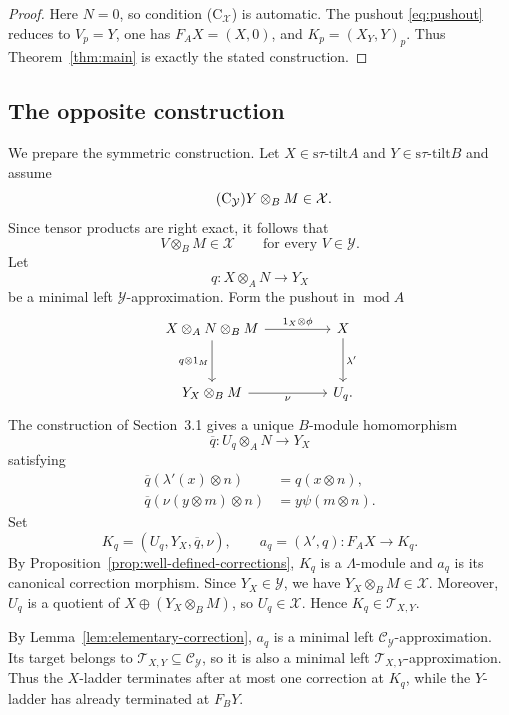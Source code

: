 \documentclass[11pt,reqno]{amsart}
\theoremstyle{definition}
\theoremstyle{remark}
\newcommand{\modu}{\operatorname{mod}}
\newcommand{\stau}{\mathrm{s}\tau\text{-}\mathrm{tilt}}
\numberwithin{equation}{section}
\begin{document}
\begin{proof}
Here $N=0$, so condition \textup{(C$_{\mathcal X}$)} is automatic.  The pushout
\eqref{eq:pushout} reduces to $V_p=Y$, one has $F_AX=(X,0)$, and
$K_p=(X_Y,Y)_p$.  Thus Theorem~\ref{thm:main} is exactly the stated
construction.
\end{proof}

\subsection{The opposite construction}

We prepare the symmetric construction.  Let $X\in\stau A$ and
$Y\in\stau B$ and assume
\begin{equation*}\tag{C$_{\mathcal Y}$}
 Y\otimes_BM\in\mathcal X.
\end{equation*}
Since tensor products are right exact, it follows that
\[
 V\otimes_BM\in\mathcal X
 \qquad\text{for every }V\in\mathcal Y.
\]
Let
\[
 q:X\otimes_AN\longrightarrow Y_X
\]
be a minimal left $\mathcal Y$-approximation.  Form the pushout in $\modu A$
\[
\begin{tikzcd}[column sep=4.5em,row sep=3.0em]
 X\otimes_AN\otimes_BM
   \arrow[r,"1_X\otimes\phi"]
   \arrow[d,"q\otimes1_M"']
 &X\arrow[d,"\lambda'"]\\
 Y_X\otimes_BM\arrow[r,"\nu"']
 &U_q.
\end{tikzcd}
\]
The construction of Section~3.1 gives a unique $B$-module homomorphism
\[
 \overline q:U_q\otimes_AN\longrightarrow Y_X
\]
satisfying
\begin{align*}
 \overline q(\lambda'(x)\otimes n)&=q(x\otimes n),\\
 \overline q(\nu(y\otimes m)\otimes n)&=y\psi(m\otimes n).
\end{align*}
Set
\[
 K_q=(U_q,Y_X,\overline q,\nu),
 \qquad
 a_q=(\lambda',q):F_AX\longrightarrow K_q.
\]
By Proposition~\ref{prop:well-defined-corrections}, $K_q$ is a
$\Lambda$-module and $a_q$ is its canonical correction morphism.  Since
$Y_X\in\mathcal Y$, we have $Y_X\otimes_BM\in\mathcal X$.  Moreover,
$U_q$ is a quotient of $X\oplus(Y_X\otimes_BM)$, so $U_q\in\mathcal X$.
Hence $K_q\in\mathcal T_{X,Y}$.

By Lemma~\ref{lem:elementary-correction}, $a_q$ is a minimal left
$\mathcal C_{\mathcal Y}$-approximation.  Its target belongs to
$\mathcal T_{X,Y}\subseteq\mathcal C_{\mathcal Y}$, so it is also a
minimal left $\mathcal T_{X,Y}$-approximation.  Thus the $X$-ladder
terminates after at most one correction at $K_q$, while the $Y$-ladder has
already terminated at $F_BY$.
\end{document}
